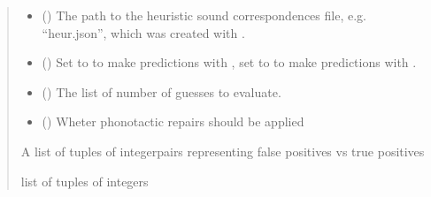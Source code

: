 \documentclass[letterpaper,10pt,english]{sphinxmanual}
\begin{document}
\begin{fulllineitems}
\begin{quote}
\begin{description}
\begin{itemize}
\item {} 
\sphinxAtStartPar
{} (\sphinxstyleliteralemphasis{\sphinxupquote{, }}) \textendash{} The path to the heuristic sound correspondences file,
e.g. “heur.json”, which was created with
.

\item {} 
\sphinxAtStartPar
{} () \textendash{} Set to  to make predictions with
, set to  to
make predictions with
.

\item {} 
\sphinxAtStartPar
{} () \textendash{} The list of number of guesses to evaluate.

\item {} 
\sphinxAtStartPar
{} (\sphinxstyleliteralemphasis{\sphinxupquote{, }}) \textendash{} Wheter phonotactic repairs should be applied

\end{itemize}

\sphinxAtStartPar
A list of tuples of integer\sphinxhyphen{}pairs
representing false positives vs true positives

\sphinxAtStartPar
list of tuples of integers

\end{description}\end{quote}

\sphinxAtStartPar
{}


\end{fulllineitems}
\end{document}
